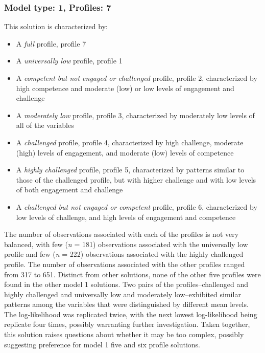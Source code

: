\documentclass[]{book}
\providecommand{\tightlist}{%
  \setlength{\itemsep}{0pt}\setlength{\parskip}{0pt}}
\theoremstyle{definition}
\theoremstyle{definition}
\theoremstyle{definition}
\theoremstyle{remark}
\begin{document}
\subsubsection{Model type: 1, Profiles:
7}\label{model-type-1-profiles-7}

This solution is characterized by:

\begin{itemize}
\tightlist
\item
  A \emph{full} profile, profile 7
\item
  A \emph{universally low} profile, profile 1
\item
  A \emph{competent but not engaged or challenged} profile, profile 2,
  characterized by high competence and moderate (low) or low levels of
  engagement and challenge
\item
  A \emph{moderately low} profile, profile 3, characterized by
  moderately low levels of all of the variables
\item
  A \emph{challenged} profile, profile 4, characterized by high
  challenge, moderate (high) levels of engagement, and moderate (low)
  levels of competence
\item
  A \emph{highly challenged} profile, profile 5, characterized by
  patterns similar to those of the challenged profile, but with higher
  challenge and with low levels of both engagement and challenge
\item
  A \emph{challenged but not engaged or competent} profile, profile 6,
  characterized by low levels of challenge, and high levels of
  engagement and competence
\end{itemize}

The number of observations associated with each of the profiles is not
very balanced, with few (\emph{n} = 181) observations associated with
the universally low profile and few (\emph{n} = 222) observations
associated with the highly challenged profile. The number of
observations associated with the other profiles ranged from 317 to 651.
Distinct from other solutions, none of the other five profiles were
found in the other model 1 solutions. Two pairs of the
profiles--challenged and highly challenged and universally low and
moderately low--exhibited similar patterns among the variables that were
distinguished by different mean levels. The log-likelihood was
replicated twice, with the next lowest log-likelihood being replicate
four times, possibly warranting further investigation. Taken together,
this solution raises questions about whether it may be too complex,
possibly suggesting preference for model 1 five and six profile
solutions.
\end{document}
